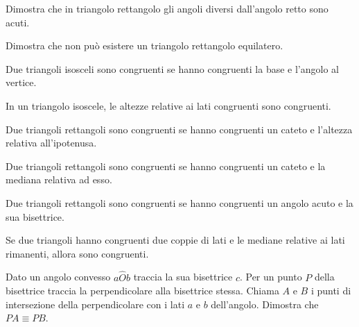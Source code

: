 \begin{multicols}{2}

\begin{esercizio}
\label{ese:3.53}
Dimostra che in triangolo rettangolo gli angoli diversi dall'angolo 
retto sono acuti.
\end{esercizio}

\begin{esercizio}
\label{ese:3.54}
Dimostra che non può esistere un triangolo rettangolo equilatero.
\end{esercizio}

\begin{esercizio}
\label{ese:3.55}
Due triangoli isosceli sono congruenti se hanno congruenti la base e 
l'angolo al vertice.
\end{esercizio}

\begin{esercizio}
\label{ese:3.56}
In un triangolo isoscele, le altezze relative ai lati congruenti sono 
congruenti. 
\end{esercizio}

\begin{esercizio}
\label{ese:3.57}
Due triangoli rettangoli sono congruenti se hanno congruenti un 
cateto e l'altezza relativa all'ipotenusa.
\end{esercizio}

\begin{esercizio}
\label{ese:3.58}
Due triangoli rettangoli sono congruenti se hanno congruenti un 
cateto e la mediana relativa ad esso.
\end{esercizio}

\begin{esercizio}
\label{ese:3.59}
Due triangoli rettangoli sono congruenti se hanno congruenti un 
angolo acuto e la sua bisettrice.
\end{esercizio}

\begin{esercizio}
\label{ese:3.60}
Se due triangoli hanno congruenti due coppie di lati e le mediane 
relative ai lati rimanenti, allora sono congruenti.
\end{esercizio}

\begin{esercizio}
\label{ese:3.69}
Dato un angolo convesso \(a\widehat{O}b\) traccia la sua bisettrice 
\(c\). Per un punto \(P\) della bisettrice traccia la perpendicolare alla 
bisettrice stessa. Chiama \(A\) e \(B\) i punti di intersezione 
della perpendicolare con i lati \(a\) e \(b\) dell'angolo. 
Dimostra che \(PA \equiv PB\).
\end{esercizio}


\end{multicols}
